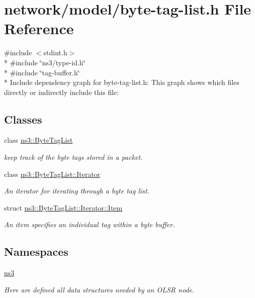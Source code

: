 \hypertarget{byte-tag-list_8h}{}\section{network/model/byte-\/tag-\/list.h File Reference}
\label{byte-tag-list_8h}
{\ttfamily \#include $<$stdint.\+h$>$}\\*
{\ttfamily \#include \char`\"{}ns3/type-\/id.\+h\char`\"{}}\\*
{\ttfamily \#include \char`\"{}tag-\/buffer.\+h\char`\"{}}\\*
Include dependency graph for byte-\/tag-\/list.h\+:
This graph shows which files directly or indirectly include this file\+:
\subsection*{Classes}
\begin{DoxyCompactItemize}
\item 
class \hyperlink{classns3_1_1ByteTagList}{ns3\+::\+Byte\+Tag\+List}
\begin{DoxyCompactList}\small\item\em keep track of the byte tags stored in a packet. \end{DoxyCompactList}\item 
class \hyperlink{classns3_1_1ByteTagList_1_1Iterator}{ns3\+::\+Byte\+Tag\+List\+::\+Iterator}
\begin{DoxyCompactList}\small\item\em An iterator for iterating through a byte tag list. \end{DoxyCompactList}\item 
struct \hyperlink{structns3_1_1ByteTagList_1_1Iterator_1_1Item}{ns3\+::\+Byte\+Tag\+List\+::\+Iterator\+::\+Item}
\begin{DoxyCompactList}\small\item\em An item specifies an individual tag within a byte buffer. \end{DoxyCompactList}\end{DoxyCompactItemize}
\subsection*{Namespaces}
\begin{DoxyCompactItemize}
\item 
 \hyperlink{namespacens3}{ns3}
\begin{DoxyCompactList}\small\item\em Here are defined all data structures needed by an O\+L\+SR node. \end{DoxyCompactList}\end{DoxyCompactItemize}
